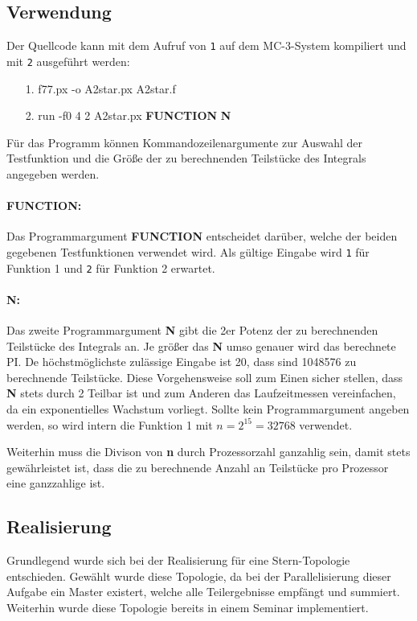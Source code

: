 \subsection{Verwendung}
\label{ref:verwendung}
Der Quellcode kann mit dem Aufruf von \texttt{1} auf dem MC-3-System kompiliert und mit \texttt{2} ausgeführt werden:
\begin{itemize}
	\item[1.] f77.px -o A2star.px A2star.f
	\item[2.] run -f0 4 2 A2star.px \textbf{FUNCTION} \textbf{N}
\end{itemize}
Für das Programm können Kommandozeilenargumente zur Auswahl der Testfunktion und die Größe der zu berechnenden Teilstücke des Integrals angegeben werden.
\paragraph{FUNCTION:}
Das Programmargument \textbf{FUNCTION} entscheidet darüber, welche der beiden gegebenen Testfunktionen verwendet wird.
Als gültige Eingabe wird \texttt{1} für Funktion 1 und \texttt{2} für Funktion 2 erwartet.
\paragraph{N:}
Das zweite Programmargument \textbf{N} gibt die 2er Potenz der zu berechnenden Teilstücke des Integrals an.
Je größer das \textbf{N} umso genauer wird das berechnete PI.
De höchstmöglichste zulässige Eingabe ist 20, dass sind 1048576 zu berechnende Teilstücke.
Diese Vorgehensweise soll zum Einen sicher stellen, dass \textbf{N} stets durch 2 Teilbar ist und zum Anderen das Laufzeitmessen vereinfachen, da ein exponentielles Wachstum vorliegt.
Sollte kein Programmargument angeben werden, so wird intern die Funktion 1 mit $n = 2^{15} = 32768$ verwendet.

Weiterhin muss die Divison von \textbf{n} durch Prozessorzahl ganzahlig sein, damit stets gewährleistet ist, dass die zu berechnende Anzahl an Teilstücke pro Prozessor eine ganzzahlige ist.

\subsection{Realisierung}
\label{ref:realisierung}
Grundlegend wurde sich bei der Realisierung für eine Stern-Topologie entschieden.
Gewählt wurde diese Topologie, da bei der Parallelisierung dieser Aufgabe ein Master existert, welche alle Teilergebnisse empfängt und summiert.
Weiterhin wurde diese Topologie bereits in einem Seminar implementiert.


